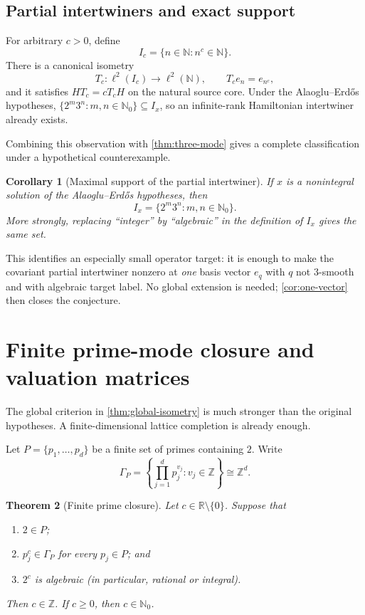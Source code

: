 \documentclass[11pt,oneside]{article}
\newtheorem{theorem}{Theorem}[section]
\newtheorem{corollary}[theorem]{Corollary}
\theoremstyle{definition}
\theoremstyle{remark}
\newcommand{\N}{\mathbb N}
\newcommand{\Nzero}{\mathbb N_0}
\newcommand{\Z}{\mathbb Z}
\newcommand{\R}{\mathbb R}
\begin{document}
\subsection{Partial intertwiners and exact support}

For arbitrary \(c>0\), define
\[
        I_c=\{n\in\N:n^c\in\N\}.
\]
There is a canonical isometry
\[
        T_c:\ell^2(I_c)\longrightarrow\ell^2(\N),\qquad
        T_c e_n=e_{n^c},
\]
and it satisfies \(HT_c=cT_cH\) on the natural source core.
Under the Alaoglu--Erd\H{o}s hypotheses,
\(\{2^m3^n:m,n\in\Nzero\}\subseteq I_x\), so an infinite-rank
Hamiltonian intertwiner already exists.

Combining this observation with \cref{thm:three-mode} gives a complete
classification under a hypothetical counterexample.

\begin{corollary}[Maximal support of the partial intertwiner]
\label{cor:max-partial-support}
If \(x\) is a nonintegral solution of the Alaoglu--Erd\H{o}s hypotheses,
then
\[
        I_x=\{2^m3^n:m,n\in\Nzero\}.
\]
More strongly, replacing ``integer'' by ``algebraic'' in the definition
of \(I_x\) gives the same set.
\end{corollary}

This identifies an especially small operator target: it is enough to
make the covariant partial intertwiner nonzero at \emph{one} basis vector
\(e_q\) with \(q\) not \(3\)-smooth and with algebraic target label.
No global extension is needed; \cref{cor:one-vector} then closes the
conjecture.

\section{Finite prime-mode closure and valuation matrices}

The global criterion in \cref{thm:global-isometry} is much stronger than
the original hypotheses.  A finite-dimensional lattice completion is
already enough.

Let \(P=\{p_1,\ldots,p_d\}\) be a finite set of primes containing \(2\).
Write
\[
        \Gamma_P
        =\left\{\prod_{j=1}^d p_j^{v_j}:v_j\in\Z\right\}
        \cong\Z^d.
\]

\begin{theorem}[Finite prime closure]\label{thm:finite-prime-closure}
Let \(c\in\R\setminus\{0\}\).  Suppose that
\begin{enumerate}
\item \(2\in P\);
\item \(p_j^c\in\Gamma_P\) for every \(p_j\in P\); and
\item \(2^c\) is algebraic (in particular, rational or integral).
\end{enumerate}
Then \(c\in\Z\).  If \(c\geq0\), then \(c\in\Nzero\).
\end{theorem}
\end{document}
